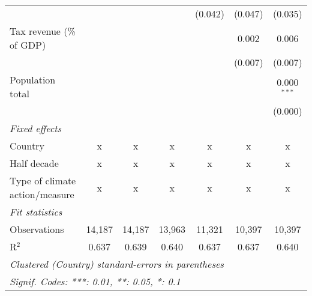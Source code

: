\begin{tabular}{lcccccc}
                                                       &               &                &                & (0.042)       & (0.047)       & (0.035)\\   
   Tax revenue (\% of GDP)                             &               &                &                &               & 0.002         & 0.006\\   
                                                       &               &                &                &               & (0.007)       & (0.007)\\   
   Population total                                    &               &                &                &               &               & 0.000$^{***}$\\   
                                                       &               &                &                &               &               & (0.000)\\   
   \emph{Fixed effects}\\
   Country                                             & x             & x              & x              & x             & x             & x\\  
   Half decade                                         & x             & x              & x              & x             & x             & x\\  
   Type of climate action/measure                      & x             & x              & x              & x             & x             & x\\  
   \midrule \emph{Fit statistics}\\
   Observations                                        & 14,187        & 14,187         & 13,963         & 11,321        & 10,397        & 10,397\\  
   R$^2$                                               & 0.637         & 0.639          & 0.640          & 0.637         & 0.637         & 0.640\\  
   \midrule
   \multicolumn{7}{l}{\emph{Clustered (Country) standard-errors in parentheses}}\\
   \multicolumn{7}{l}{\emph{Signif. Codes: ***: 0.01, **: 0.05, *: 0.1}}\\
\end{tabular}
\par\endgroup



